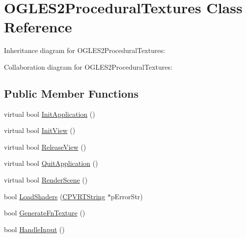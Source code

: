 \hypertarget{class_o_g_l_e_s2_procedural_textures}{\section{O\+G\+L\+E\+S2\+Procedural\+Textures Class Reference}
\label{class_o_g_l_e_s2_procedural_textures}
}


Inheritance diagram for O\+G\+L\+E\+S2\+Procedural\+Textures\+:


Collaboration diagram for O\+G\+L\+E\+S2\+Procedural\+Textures\+:
\subsection*{Public Member Functions}
\begin{DoxyCompactItemize}
\item 
virtual bool \hyperlink{class_o_g_l_e_s2_procedural_textures_ae1988c55d3e1cc77b71f26c043dbc774}{Init\+Application} ()
\item 
virtual bool \hyperlink{class_o_g_l_e_s2_procedural_textures_a7a1136bb8be29c555f7a7569ba9c76b6}{Init\+View} ()
\item 
virtual bool \hyperlink{class_o_g_l_e_s2_procedural_textures_a871f24b7ba3108b112947a02a8d1b56c}{Release\+View} ()
\item 
virtual bool \hyperlink{class_o_g_l_e_s2_procedural_textures_adc2866804b1b17ec36692bd7631d14a0}{Quit\+Application} ()
\item 
virtual bool \hyperlink{class_o_g_l_e_s2_procedural_textures_a2b52f9799929158aa92c72d7d99984d4}{Render\+Scene} ()
\item 
bool \hyperlink{class_o_g_l_e_s2_procedural_textures_a5aecbd38c8dfb3a64a2f007aff4028a7}{Load\+Shaders} (\hyperlink{class_c_p_v_r_t_string}{C\+P\+V\+R\+T\+String} $\ast$p\+Error\+Str)
\item 
bool \hyperlink{class_o_g_l_e_s2_procedural_textures_aab11efba0040b3ac38a1a766b2eed60e}{Generate\+Fn\+Texture} ()
\item 
bool \hyperlink{class_o_g_l_e_s2_procedural_textures_a001252cfa705850941a90a9620d27069}{Handle\+Input} ()
\end{DoxyCompactItemize}
